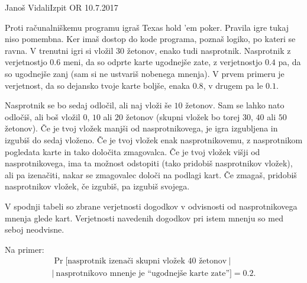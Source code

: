 \begin{naloga}{Janoš Vidali}{Izpit OR 10.7.2017}
\begin{vprasanje}
Proti računalniškemu programu igraš Texas hold 'em poker.
Pravila igre tukaj niso pomembna.
Ker imaš dostop do kode programa, poznaš logiko, po kateri se ravna.
V trenutni igri si vložil $30$ žetonov, enako tudi nasprotnik.
Nasprotnik z verjetnostjo $0.6$ meni, da so odprte karte ugodnejše zate,
z verjetnostjo $0.4$ pa, da so ugodnejše zanj
(sam si ne ustvariš nobenega mnenja).
V prvem primeru je verjetnost, da so dejansko tvoje karte boljše, enaka $0.8$,
v drugem pa le $0.1$.

Nasprotnik se bo sedaj odločil, ali naj vloži še $10$ žetonov.
Sam se lahko nato odločiš, ali boš vložil $0$, $10$ ali $20$ žetonov
(skupni vložek bo torej $30$, $40$ ali $50$ žetonov).
Če je tvoj vložek manjši od nasprotnikovega,
je igra izgubljena in izgubiš do sedaj vloženo.
Če je tvoj vložek enak na\-sprot\-ni\-ko\-ve\-mu,
z nasprotnikom pogledata karte in tako določita zmagovalca.
Če je tvoj vložek višji od nasprotnikovega,
ima ta možnost odstopiti (tako pridobiš nasprotnikov vložek),
ali pa izenačiti, nakar se zmagovalec določi na podlagi kart.
Če zmagaš, pridobiš nasprotnikov vložek,
če izgubiš, pa izgubiš svojega.

V spodnji tabeli so zbrane verjetnosti dogodkov
v odvisnosti od nasprotnikovega mnenja glede kart.
Verjetnosti navedenih dogodkov pri istem mnenju so med seboj neodvisne.
\begin{center}
\end{center}
Na primer:
\begin{multline*}
\Pr[\text{nasprotnik izenači skupni vložek $40$ žetonov} \ | \\
| \ \text{nasprotnikovo mnenje je ``ugodnejše karte zate''}] = 0.2 .
\end{multline*}


\end{vprasanje}
\end{naloga}

